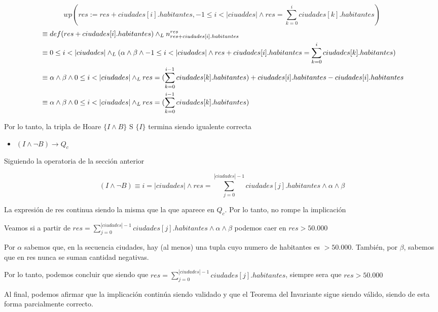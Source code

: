 \documentclass[10pt,a4paper]{article}
\begin{document}
\begin {enumerate}
    $$ wp(res := res + ciudades[i].habitantes, -1 \leq i < |ciuaddes| \land res =  \sum\limits_{k=0}^{i}{ciudades[k].habitantes}) $$
    \begin{align*}
        &\equiv def(res + ciudades[i].habitantes) \land _L n_{res + ciudades[i].habitantes}^{res} \\
        &\equiv 0 \leq i < |ciudades| \land _L (\alpha \land \beta \land -1 \leq i < |ciudades| \land res + ciudades[i].habitantes = \sum\limits_{k=0}^{i}{ciudades[k].habitantes} ) \\
        &\equiv \alpha \land \beta \land  0 \leq i < |ciudades| \land _L res = (\sum\limits_{k=0}^{i - 1}{ciudades[k].habitantes}) + ciudades[i].habitantes - ciudades[i].habitantes \\
        &\equiv \alpha \land \beta \land  0 \leq i < |ciudades| \land _L res = (\sum\limits_{k=0}^{i - 1}{ciudades[k].habitantes})  \\
    \end{align*}


    Por lo tanto, la tripla de Hoare $\{ I \land B \}$ S $ \{ I\}$ termina siendo igualente correcta

    \begin{itemize}
        \item $(I \land \neg B) \to Q_{c}$
    \end{itemize}

    Siguiendo la operatoria de la sección anterior

    $$ (I \land \neg B) \equiv i = |ciudades| \land res = \sum\limits^{|ciudades|- 1}_{j = 0}{ciudades[j].habitantes} \land \alpha \land \beta $$

    La expresión de res continua siendo la misma que la que aparece en $Q_{c}$. Por lo tanto, no rompe la implicación

    Veamos si a partir de $res = \sum\limits^{|ciudades|- 1}_{j = 0}{ciudades[j].habitantes} \land \alpha \land \beta$ podemos caer en $res > 50.000$

    Por $\alpha$ sabemos que, en la secuencia ciudades, hay (al menos) una tupla cuyo numero de habitantes es $> 50.000$. También, por $\beta$, sabemos
    que en res nunca se suman cantidad negativas.

    Por lo tanto, podemos concluir que siendo que $res = \sum\limits^{|ciudades|- 1}_{j = 0}{ciudades[j].habitantes}$, siempre sera que $res > 50.000$
    
    Al final, podemos afirmar que la implicación continúa siendo validado y que el Teorema del Invariante sigue siendo válido, siendo de esta forma parcialmente correcto. 


\end{enumerate}
\end{document}
